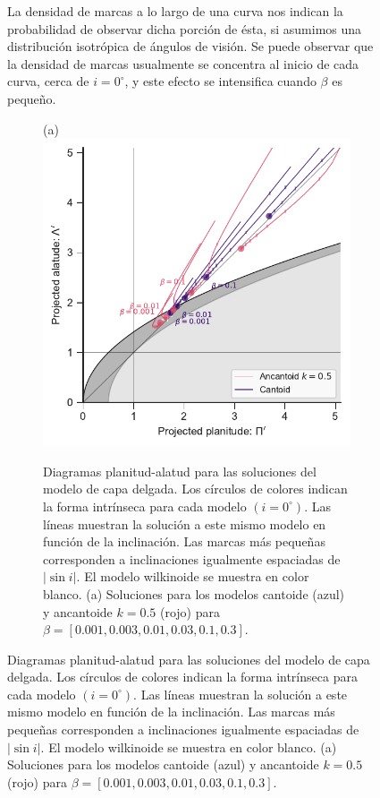 \begin{figure}
La densidad de marcas a lo largo de una curva nos indican la probabilidad de observar dicha porción de ésta, si asumimos una distribución isotrópica de ángulos de visión. Se puede observar que la densidad de marcas usualmente se concentra al inicio de cada curva, cerca de $i=0^\circ$, y este efecto se intensifica cuando $\beta$ es pequeño.

\begin{figure}
  \centering
    (a)  \\
    \includegraphics[width=0.7\linewidth]{./Figures/ancantoid-R90-vs-Rc-a}                                                                    
  \caption{Diagramas planitud-alatud para las soluciones del modelo de capa delgada. Los círculos de colores indican la forma intrínseca para cada modelo $(i=0^\circ)$. Las líneas muestran la solución a este mismo modelo en función de la inclinación. Las marcas más pequeñas corresponden a inclinaciones igualmente espaciadas de $|\sin i|$. El modelo wilkinoide se muestra en color blanco. (a) Soluciones para los modelos cantoide (azul) y ancantoide $k=0.5$ (rojo) para $\beta=[0.001, 0.003, 0.01, 0.03, 0.1, 0.3]$.}
  \label{fig:Lambda-Pi-diagram}
\end{figure}


\end{figure}
